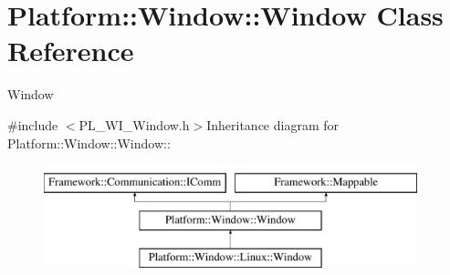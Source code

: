 \hypertarget{classPlatform_1_1Window_1_1Window}{
\section{Platform::Window::Window Class Reference}
\label{classPlatform_1_1Window_1_1Window}
}


Window  


{\ttfamily \#include $<$PL\_\-WI\_\-Window.h$>$}Inheritance diagram for Platform::Window::Window::\begin{figure}[H]
\begin{center}
\leavevmode
\includegraphics[height=3cm]{classPlatform_1_1Window_1_1Window}
\end{center}
\end{figure}
